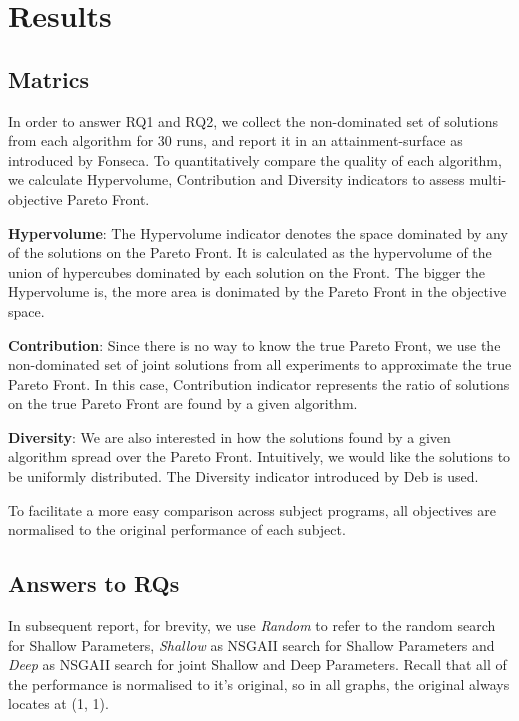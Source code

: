 
\section{Results}
\label{sec_results}
\subsection{Matrics}
\label{sec_matrics}

In order to answer RQ1 and RQ2, we collect the non-dominated set of solutions from each algorithm for 30 runs, and report it in an attainment-surface as introduced by Fonseca\cite{attainment_surface:1996}. To quantitatively compare the quality of each algorithm, we calculate Hypervolume, Contribution and Diversity indicators to assess multi-objective Pareto Front.

\textbf{Hypervolume}: The Hypervolume indicator\cite{797969} denotes the space dominated by any of the solutions on the Pareto Front. It is calculated as the hypervolume of the union of hypercubes dominated by each solution on the Front. The bigger the Hypervolume is, the more area is donimated by the Pareto Front in the objective space.

\textbf{Contribution}: Since there is no way to know the true Pareto Front, we use the non-dominated set of joint solutions from all experiments to approximate the true Pareto Front. In this case, Contribution indicator represents the ratio of solutions on the true Pareto Front are found by a given algorithm.

\textbf{Diversity}: We are also interested in how the solutions found by a given algorithm spread over the Pareto Front. Intuitively, we would like the solutions to be uniformly distributed. The Diversity indicator introduced by Deb\cite{996017} is used.

To facilitate a more easy comparison across subject programs, all objectives are normalised to the original performance of each subject.

\subsection{Answers to RQs}
\label{sec_answers}

In subsequent report, for brevity, we use \emph{Random} to refer to the random search for Shallow Parameters, \emph{Shallow} as NSGAII search for Shallow Parameters and \emph{Deep} as NSGAII search for joint Shallow and Deep Parameters. Recall that all of the performance is normalised to it's original, so in all graphs, the original always locates at (1, 1).

